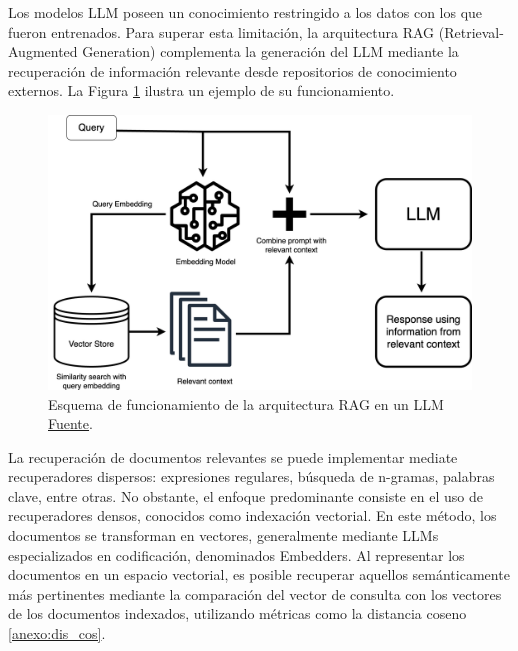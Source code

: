 Los modelos LLM poseen un conocimiento restringido a los datos con los que fueron entrenados. Para superar esta limitación, la arquitectura RAG (Retrieval-Augmented Generation) complementa la generación del LLM mediante la recuperación de información relevante desde repositorios de conocimiento externos. La Figura \ref{fig:rag} ilustra un ejemplo de su funcionamiento.    

\begin{figure}[H]
  \centering
  \includegraphics[width=0.75\linewidth]{figures/RAG.png}
  \caption{Esquema de funcionamiento de la arquitectura RAG en un LLM \href{https://www.clarifai.com/blog/what-is-rag-retrieval-augmented-generation}{Fuente}.}
  \label{fig:rag}
\end{figure}

La recuperación de documentos relevantes se puede implementar mediate recuperadores dispersos: expresiones regulares, búsqueda de n-gramas, palabras clave, entre otras. No obstante, el enfoque predominante consiste en el uso de recuperadores densos, conocidos como indexación vectorial. En este método, los documentos se transforman en vectores, generalmente mediante LLMs especializados en codificación, denominados Embedders. Al representar los documentos en un espacio vectorial, es posible recuperar aquellos semánticamente más pertinentes mediante la comparación del vector de consulta con los vectores de los documentos indexados, utilizando métricas como la distancia coseno \ref{anexo:dis_cos}.

